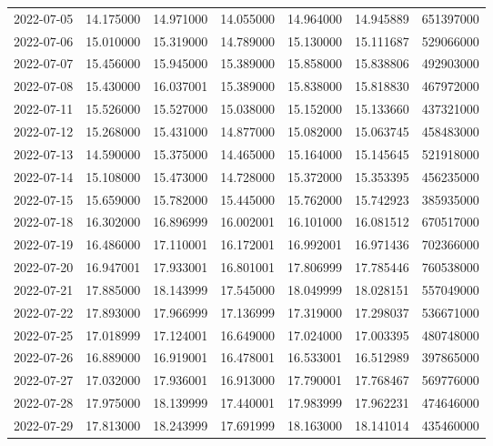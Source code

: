 \begin{tabular}{lrrrrrr}
2022-07-05 &   14.175000 &   14.971000 &   14.055000 &   14.964000 &   14.945889 &   651397000 \\
2022-07-06 &   15.010000 &   15.319000 &   14.789000 &   15.130000 &   15.111687 &   529066000 \\
2022-07-07 &   15.456000 &   15.945000 &   15.389000 &   15.858000 &   15.838806 &   492903000 \\
2022-07-08 &   15.430000 &   16.037001 &   15.389000 &   15.838000 &   15.818830 &   467972000 \\
2022-07-11 &   15.526000 &   15.527000 &   15.038000 &   15.152000 &   15.133660 &   437321000 \\
2022-07-12 &   15.268000 &   15.431000 &   14.877000 &   15.082000 &   15.063745 &   458483000 \\
2022-07-13 &   14.590000 &   15.375000 &   14.465000 &   15.164000 &   15.145645 &   521918000 \\
2022-07-14 &   15.108000 &   15.473000 &   14.728000 &   15.372000 &   15.353395 &   456235000 \\
2022-07-15 &   15.659000 &   15.782000 &   15.445000 &   15.762000 &   15.742923 &   385935000 \\
2022-07-18 &   16.302000 &   16.896999 &   16.002001 &   16.101000 &   16.081512 &   670517000 \\
2022-07-19 &   16.486000 &   17.110001 &   16.172001 &   16.992001 &   16.971436 &   702366000 \\
2022-07-20 &   16.947001 &   17.933001 &   16.801001 &   17.806999 &   17.785446 &   760538000 \\
2022-07-21 &   17.885000 &   18.143999 &   17.545000 &   18.049999 &   18.028151 &   557049000 \\
2022-07-22 &   17.893000 &   17.966999 &   17.136999 &   17.319000 &   17.298037 &   536671000 \\
2022-07-25 &   17.018999 &   17.124001 &   16.649000 &   17.024000 &   17.003395 &   480748000 \\
2022-07-26 &   16.889000 &   16.919001 &   16.478001 &   16.533001 &   16.512989 &   397865000 \\
2022-07-27 &   17.032000 &   17.936001 &   16.913000 &   17.790001 &   17.768467 &   569776000 \\
2022-07-28 &   17.975000 &   18.139999 &   17.440001 &   17.983999 &   17.962231 &   474646000 \\
2022-07-29 &   17.813000 &   18.243999 &   17.691999 &   18.163000 &   18.141014 &   435460000 \\

\end{tabular}
